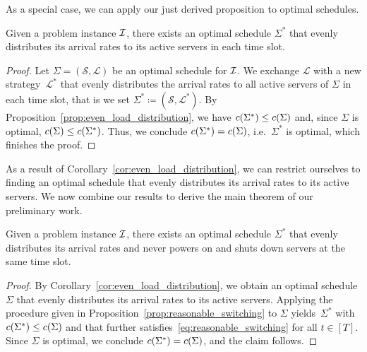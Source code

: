 As a special case, we can apply our just derived proposition to optimal schedules.
\begin{cor}\label{cor:even_load_distribution}
Given a problem instance $\mathcal{I}$, there exists an optimal schedule $\Sigma^*$ that evenly distributes its arrival rates to its active servers in each time slot.
\end{cor}
\begin{proof}
Let $\Sigma=(\mathcal{S},\mathcal{L})$ be an optimal schedule for $\mathcal{I}$. We exchange $\mathcal{L}$ with a new strategy~$\mathcal{L}^*$ that evenly distributes the arrival rates to all active servers of $\Sigma$ in each time slot, that is we set $\Sigma^*\coloneqq(\mathcal{S},\mathcal{L}^*)$. By Proposition~\ref{prop:even_load_distribution}, we have $c(\Sigma^*)\le c(\Sigma)$ and, since $\Sigma$ is optimal, $c(\Sigma)\le c(\Sigma^*)$. Thus, we conclude $c(\Sigma^*)=c(\Sigma)$, i.e.\ $\Sigma^*$ is optimal, which finishes the proof.
\end{proof}
As a result of Corollary~\ref{cor:even_load_distribution}, we can restrict ourselves to finding an optimal schedule that evenly distributes its arrival rates to its active servers. We now combine our results to derive the main theorem of our preliminary work.
\begin{thm}\label{thm:even_load_distribution_reasonable_switching}
Given a problem instance $\mathcal{I}$, there exists an optimal schedule $\Sigma^*$ that evenly distributes its arrival rates and never powers on and shuts down servers at the same time slot.
\end{thm}
\begin{proof}
By Corollary~\ref{cor:even_load_distribution}, we obtain an optimal schedule $\Sigma$ that evenly distributes its arrival rates to its active servers. Applying the procedure given in Proposition~\ref{prop:reasonable_switching} to $\Sigma$ yields~$\Sigma^*$ with $c(\Sigma^*)\le c(\Sigma)$ and that further satisfies~\eqref{eq:reasonable_switching} for all $t\in[T]$. Since $\Sigma$ is optimal, we conclude $c(\Sigma^*)=c(\Sigma)$, and the claim follows.
\end{proof}

